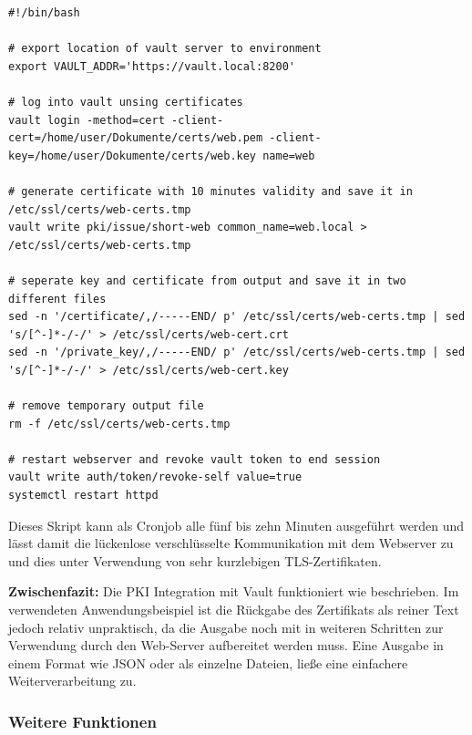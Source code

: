 \documentclass[
book,
a4paper,   
titlepage,  
halfparskip,
12pt        
]{scrartcl}
\begin{document}
\begin{onehalfspacing}
\begin{lstlisting}[caption={[Skript PKI] Shell Skript zum Erstellen eines neuen Serverzertifikats unter Verwendung der Vault \ac{PKI}}, label=lst:skript, captionpos=b, basicstyle=\ttfamily] 
#!/bin/bash

# export location of vault server to environment
export VAULT_ADDR='https://vault.local:8200'

# log into vault unsing certificates
vault login -method=cert -client-cert=/home/user/Dokumente/certs/web.pem -client-key=/home/user/Dokumente/certs/web.key name=web

# generate certificate with 10 minutes validity and save it in /etc/ssl/certs/web-certs.tmp
vault write pki/issue/short-web common_name=web.local > /etc/ssl/certs/web-certs.tmp

# seperate key and certificate from output and save it in two different files
sed -n '/certificate/,/-----END/ p' /etc/ssl/certs/web-certs.tmp | sed 's/[^-]*-/-/' > /etc/ssl/certs/web-cert.crt
sed -n '/private_key/,/-----END/ p' /etc/ssl/certs/web-certs.tmp | sed 's/[^-]*-/-/' > /etc/ssl/certs/web-cert.key

# remove temporary output file
rm -f /etc/ssl/certs/web-certs.tmp

# restart webserver and revoke vault token to end session
vault write auth/token/revoke-self value=true
systemctl restart httpd

\end{lstlisting}

Dieses Skript kann als Cronjob alle fünf bis zehn Minuten ausgeführt werden und lässt damit die lückenlose verschlüsselte Kommunikation mit dem Webserver zu und dies unter Verwendung von sehr kurzlebigen \ac{TLS}-Zertifikaten. 

\textbf{Zwischenfazit:} Die PKI Integration mit Vault funktioniert wie beschrieben. Im verwendeten Anwendungsbeispiel ist die Rückgabe des Zertifikats als reiner Text jedoch relativ unpraktisch, da die Ausgabe noch mit in weiteren Schritten zur Verwendung durch den Web-Server aufbereitet werden muss. Eine Ausgabe in einem Format wie \ac{JSON} oder als einzelne Dateien, ließe eine einfachere Weiterverarbeitung zu.

\subsubsection{Weitere Funktionen}


\end{onehalfspacing}
\end{document}
